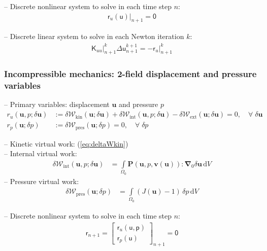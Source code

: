 \documentclass[a4paper,12pt]{report}
\newcommand{\bs}[1]{\boldsymbol{#1}}
\newcommand{\Om}{\mathit{\Omega}}
\newcommand{\ROP}{\bs{\mathsf{r}}}
\begin{document}
-- Discrete nonlinear system to solve in each time step $n$:
\begin{align}
\left.\ROP_{u}(\bs{\mathsf{u}})\right|_{n+1} = \bs{\mathsf{0}}\label{eq:nonlin_sys_solid}
\end{align}

-- Discrete linear system to solve in each Newton iteration $k$:
\begin{align}
\left. \bs{\mathsf{K}}_{uu} \right|_{n+1}^{k} \Delta\bs{\mathsf{u}}_{n+1}^{k+1}=-\left. \ROP_{u} \right|_{n+1}^{k} \label{eq:lin_sys_solid}
\end{align}


\subsubsection{Incompressible mechanics: 2-field displacement and pressure variables}
-- Primary variables: displacement $\bs{u}$ and pressure $p$
\begin{align}
r_u(\bs{u},p;\delta\bs{u}) &:= \delta \mathcal{W}_{\mathrm{kin}}(\bs{u};\delta\bs{u}) + \delta \mathcal{W}_{\mathrm{int}}(\bs{u},p;\delta\bs{u}) - \delta \mathcal{W}_{\mathrm{ext}}(\bs{u};\delta\bs{u}) = 0, \quad \forall \; \delta\bs{u} \label{eq:res_u_solid_incomp}\\
r_p(\bs{u};\delta p) &:= \delta \mathcal{W}_{\mathrm{pres}}(\bs{u};\delta p) = 0, \quad \forall \; \delta p
\end{align}

-- Kinetic virtual work: (\ref{eq:deltaWkin})\\
-- Internal virtual work:
\begin{align}
\delta \mathcal{W}_{\mathrm{int}}(\bs{u},p;\delta\bs{u}) &= \int\limits_{\Om_{0}} \bs{P}(\bs{u},p,\bs{v}(\bs{u})) : \bs{\nabla}_{0} \delta\bs{u} \,\mathrm{d}V \label{eq:deltaWint_incomp}
\end{align}
-- Pressure virtual work:
\begin{align}
\delta \mathcal{W}_{\mathrm{pres}}(\bs{u};\delta p) &= \int\limits_{\Om_{0}} (J(\bs{u}) - 1) \,\delta p \,\mathrm{d}V \label{eq:deltaWpres}
\end{align}

-- Discrete nonlinear system to solve in each time step $n$:
\begin{align}
\ROP_{n+1} = \begin{bmatrix} \ROP_{u}(\bs{\mathsf{u}},\bs{\mathsf{p}}) \\ \ROP_{p}(\bs{\mathsf{u}}) \end{bmatrix}_{n+1} = \bs{\mathsf{0}}\label{eq:nonlin_sys_solid_inc}
\end{align}
\end{document}
